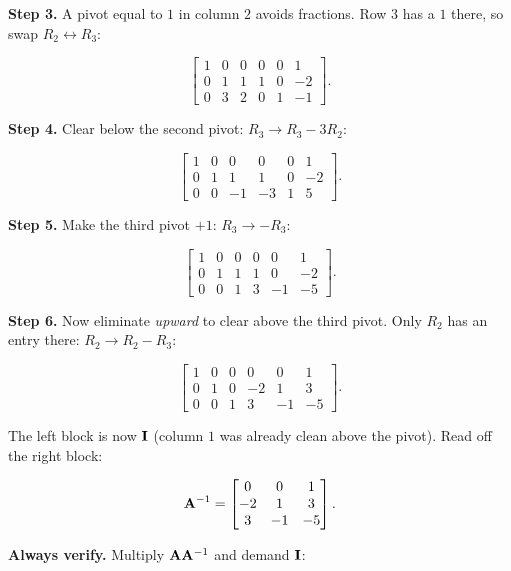 \textbf{Step 3.} A pivot equal to $1$ in column $2$ avoids fractions. Row $3$ has a $1$ there, so swap
$R_2 \leftrightarrow R_3$:

\[
\left[\begin{array}{ccc|ccc}
1 & 0 & 0 & 0 & 0 & 1 \\
0 & 1 & 1 & 1 & 0 & -2 \\
0 & 3 & 2 & 0 & 1 & -1
\end{array}\right].
\]

\textbf{Step 4.} Clear below the second pivot: $R_3 \to R_3 - 3R_2$:

\[
\left[\begin{array}{ccc|ccc}
1 & 0 & 0 & 0 & 0 & 1 \\
0 & 1 & 1 & 1 & 0 & -2 \\
0 & 0 & -1 & -3 & 1 & 5
\end{array}\right].
\]

\textbf{Step 5.} Make the third pivot $+1$: $R_3 \to -R_3$:

\[
\left[\begin{array}{ccc|ccc}
1 & 0 & 0 & 0 & 0 & 1 \\
0 & 1 & 1 & 1 & 0 & -2 \\
0 & 0 & 1 & 3 & -1 & -5
\end{array}\right].
\]

\textbf{Step 6.} Now eliminate \emph{upward} to clear above the third pivot. Only $R_2$
has an entry there: $R_2 \to R_2 - R_3$:

\[
\left[\begin{array}{ccc|ccc}
1 & 0 & 0 & 0 & 0 & 1 \\
0 & 1 & 0 & -2 & 1 & 3 \\
0 & 0 & 1 & 3 & -1 & -5
\end{array}\right].
\]

The left block is now $\mathbf{I}$ (column $1$ was already clean above the pivot). Read off
the right block:

\[
\mathbf{A}^{-1} = \begin{bmatrix} 0 & 0 & 1 \\ -2 & 1 & 3 \\ 3 & -1 & -5 \end{bmatrix}.
\]

\textbf{Always verify.} Multiply $\mathbf{A}\mathbf{A}^{-1}$ and demand $\mathbf{I}$:

